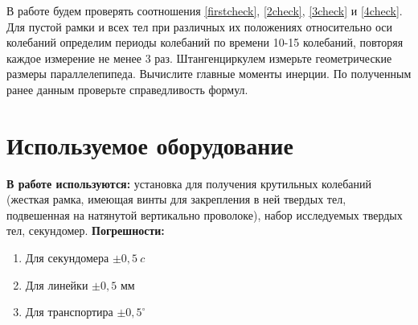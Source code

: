 В работе будем проверять соотношения \eqref{firstcheck}, \eqref{2check}, \eqref{3check} и \eqref{4check}.
Для пустой рамки и всех тел при различных их положениях относительно оси колебаний определим периоды колебаний по времени 10-15
колебаний, повторяя каждое измерение не менее 3 раз. Штангенциркулем измерьте
геометрические размеры параллелепипеда. Вычислите главные моменты инерции. По
полученным ранее данным проверьте справедливость формул.
\section{Используемое оборудование}
\textbf{В работе используются:} установка для получения крутильных
колебаний (жесткая рамка, имеющая винты для закрепления в ней
твердых тел, подвешенная на натянутой вертикально проволоке), набор исследуемых твердых тел, секундомер.
\textbf{Погрешности:}\begin{enumerate}
   \item  Для секундомера $ \pm 0,5~c $
   \item Для линейки $ \pm 0,5\text{ мм } $
   \item Для транспортира $ \pm 0,5^\circ $
\end{enumerate}
